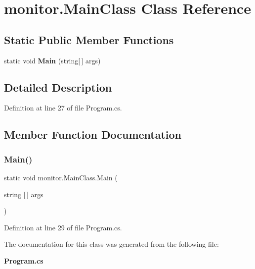 \section{monitor.\+Main\+Class Class Reference}
\label{classmonitor_1_1_main_class}
\subsection*{Static Public Member Functions}
\begin{DoxyCompactItemize}
\item 
static void \textbf{ Main} (string[$\,$] args)
\end{DoxyCompactItemize}


\subsection{Detailed Description}


Definition at line 27 of file Program.\+cs.



\subsection{Member Function Documentation}
\mbox{\label{classmonitor_1_1_main_class_a991579f985cc4071757b30a8b035e7c1}} 
\subsubsection{Main()}
{\footnotesize\ttfamily static void monitor.\+Main\+Class.\+Main (\begin{DoxyParamCaption}\item[{string [$\,$]}]{args }\end{DoxyParamCaption})\hspace{0.3cm}{\ttfamily [static]}}



Definition at line 29 of file Program.\+cs.



The documentation for this class was generated from the following file\+:\begin{DoxyCompactItemize}
\item 
\textbf{ Program.\+cs}\end{DoxyCompactItemize}
